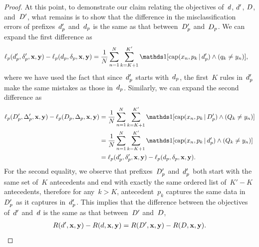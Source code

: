 \begin{proof}
At this point, to demonstrate our claim relating the objectives
of~${d}$, ${d}'$, ${D}$, and~${D}'$, what remains is to
show that the difference in the misclassification errors
of prefixes~$d_p'$ and~$d_p$ is the same as that
between~$D_p'$ and~$D_p$.
%
We can expand the first difference as
\begin{align}
\Loss_p(\Prefix', \Labels', \x, \y) - \Loss_p(\Prefix, \Labels, \x, \y)
&= \frac{1}{N} \sum_{n=1}^N \sum_{k=K+1}^{K'}
\one [ \Cap(x_n, p_k \given \Prefix') \wedge (q_k \neq y_n) ],
\end{align}
where we have used the fact that since~$d_p'$
starts with~$d_p$, the first~$K$ rules in~$d_p'$
make the same mistakes as those in~$d_p$.
%
Similarly, we can expand the second difference as
\begin{align}
\Loss_p(\PrefixB', \LabelsB', \x, \y) - \Loss_p(\PrefixB, \LabelsB, \x, \y)
&= \frac{1}{N} \sum_{n=1}^N \sum_{k=K+1}^{K'}
\one [ \Cap(x_n, p_k \given \PrefixB') \wedge (Q_k \neq y_n) ] \nn \\
&= \frac{1}{N} \sum_{n=1}^N \sum_{k=K+1}^{K'}
\one [ \Cap(x_n, p_k \given \Prefix') \wedge (Q_k \neq y_n) ] \nn \\
&= \Loss_p(\Prefix', \Labels', \x, \y) - \Loss_p(\Prefix, \Labels, \x, \y).
\end{align}
For the second equality, we observe that prefixes~$D_p'$
and~$d_p'$ both start with the same set of~$K$ antecedents
and end with exactly the same ordered list of~${K' - K}$ antecedents,
therefore for any~${k > K}$, antecedent~$p_k$ captures the same
data in~$D_p'$ as it captures in~$d_p'$.
%
This implies that the difference between the objectives
of~${d}'$ and~${d}$ is the same as that between~${D}'$ and~${D}$, \ie
\begin{align}
\Obj(\RL', \x, \y) - \Obj(\RL, \x, \y)
= \Obj(\RLB', \x, \y) - \Obj(\RLB, \x, \y).
\label{eq:analogous}
\end{align}


\end{proof}
